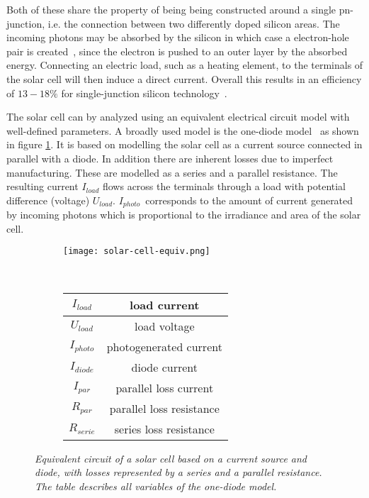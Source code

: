 Both of these share the property of being being constructed around a single pn-junction, i.e. the connection between two differently doped silicon areas.
The incoming photons may be absorbed by the silicon in which case a electron-hole pair is created~\cite{Zhao2010thesis}, since the electron is pushed to an outer layer by the absorbed energy.
Connecting an electric load, such as a heating element, to the terminals of the solar cell will then induce a direct current.
Overall this results in an efficiency of $13-18\%$ for single-junction silicon technology~\cite{Zhao2010thesis}.

The solar cell can by analyzed using an equivalent electrical circuit model with well-defined parameters.
A broadly used model is the one-diode model~\cite{Walker2001} as shown in figure \ref{fig:solar-cell-equiv}.
It is based on modelling the solar cell as a current source connected in parallel with a diode.
In addition there are inherent losses due to imperfect manufacturing.
These are modelled as a series and a parallel resistance.
The resulting current $I_{load}$ flows across the terminals through a load with potential difference (voltage) $U_{load}$.
$I_{photo}$ corresponds to the amount of current generated by incoming photons which is proportional to the irradiance and area of the solar cell.

\begin{figure}[!ht]
\centering
\begin{subfigure}{0.4\textwidth}
  \texttt{[image: solar-cell-equiv.png]}
\end{subfigure}
~
\begin{subfigure}{0.4\textwidth}
  \begin{tabular}[b]{| c | c |}
  \hline
  $I_{load}$ & load current \\ \hline
  $U_{load}$ & load voltage\\ \hline
  $I_{photo}$ & photogenerated current \\ \hline
  $I_{diode}$ & diode current \\ \hline
  $I_{par}$ & parallel loss current \\ \hline
  $R_{par}$ & parallel loss resistance \\ \hline
  $R_{serie}$ & series loss resistance \\ \hline
  \end{tabular}
\end{subfigure}
  \caption[Equivalent circuit of a solar cell]{
    \emph{
    Equivalent circuit of a solar cell based on a current source and diode,
    with losses represented by a series and a parallel resistance.
    The table describes all variables of the one-diode model.
    }
  }
  \label{fig:solar-cell-equiv}
\end{figure}

